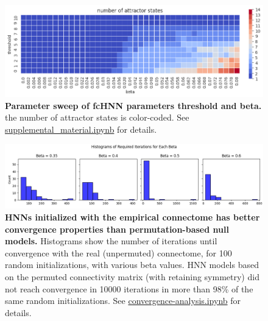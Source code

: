 \documentclass{article}
\begin{document}
\begin{figure}[!htbp]
\centering
\includegraphics[width=0.7\linewidth]{files/att_state_emergence_-d668b40e9aaff9d7b36a91fe565be8d4.png}
\caption[]{\textbf{Parameter sweep of fcHNN parameters threshold and beta.} the number of attractor states is color-coded. See \href{https://github.com/pni-lab/connattractor/blob/master/notebooks/supplemental\_material.ipynb}{supplemental\_material.ipynb} for details.}
\label{si_att_state_emergence_over_beta}
\end{figure}

\begin{figure}[!htbp]
\centering
\includegraphics[width=0.7\linewidth]{files/si_convergence-204b7347bca8b034feb585847478cbb9.png}
\caption[]{\textbf{HNNs initialized with the empirical connectome has better convergence properties than permutation-based null models.} Histograms show the number of iterations until convergence with the real (unpermuted) connectome, for 100 random initializations, with various beta values. HNN models based on the permuted connectivity matrix (with retaining symmetry) did not reach convergence in 10000 iterations in more than 98\% of the same random initializations. See \href{https://github.com/pni-lab/connattractor/blob/master/notebooks/convergence\_analysis.ipynb}{convergence-analysis.ipynb} for details.}
\label{si_convergence}
\end{figure}
\end{document}
